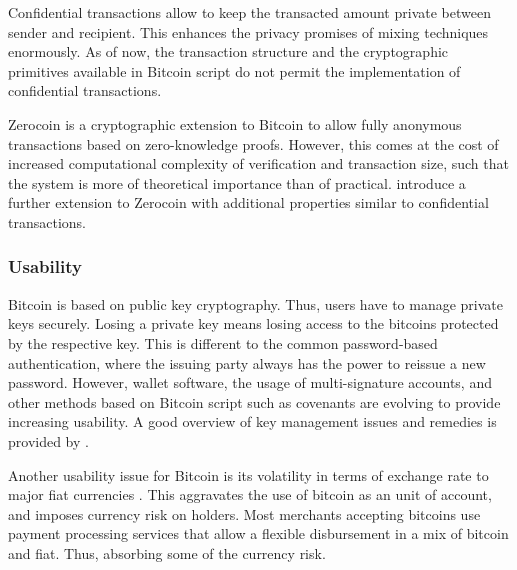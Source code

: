 Confidential transactions \parencite{nullc2015} allow to keep the transacted amount private between sender and recipient. This enhances the privacy promises of mixing techniques enormously. As of now, the transaction structure and the cryptographic primitives available in Bitcoin script do not permit the implementation of confidential transactions.

Zerocoin \parencite{6547123} is a cryptographic extension to Bitcoin to allow fully anonymous transactions based on zero-knowledge proofs. However, this comes at the cost of increased computational complexity of verification and transaction size, such that the system is more of theoretical importance than of practical. \cite{Androulaki2014} introduce a further extension to Zerocoin with additional properties similar to confidential transactions.

\subsubsection{Usability}

Bitcoin is based on public key cryptography. Thus, users have to manage private keys securely. Losing a private key means losing access to the bitcoins protected by the respective key. This is different to the common password-based authentication, where the issuing party always has the power to reissue a new password. 
However, wallet software, the usage of multi-signature accounts, and other methods based on Bitcoin script such as covenants \parencite{moserbitcoin} are evolving to provide increasing usability. 
A good overview of key management issues and remedies is provided by \cite{eskandari2015first}.

Another usability issue for Bitcoin is its volatility in terms of exchange rate to major fiat currencies \parencite{Luther2014,Sapuric2014}. This aggravates the use of bitcoin as an unit of account, and imposes currency risk on holders. Most merchants accepting bitcoins use payment processing services that allow a flexible disbursement in a mix of bitcoin and fiat. Thus, absorbing some of the currency risk.




